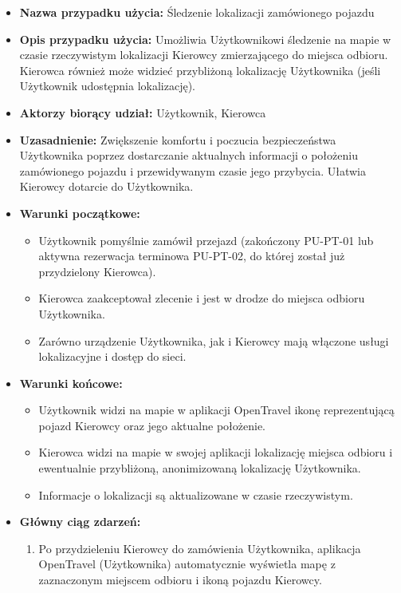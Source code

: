 \documentclass[a4paper,12pt]{article}
\begin{document}
\begin{itemize}
    \item \textbf{Nazwa przypadku użycia:} Śledzenie lokalizacji zamówionego pojazdu
    \item \textbf{Opis przypadku użycia:} Umożliwia Użytkownikowi śledzenie na mapie w czasie rzeczywistym lokalizacji Kierowcy zmierzającego do miejsca odbioru. Kierowca również może widzieć przybliżoną lokalizację Użytkownika (jeśli Użytkownik udostępnia lokalizację).
    \item \textbf{Aktorzy biorący udział:} Użytkownik, Kierowca
    \item \textbf{Uzasadnienie:} Zwiększenie komfortu i poczucia bezpieczeństwa Użytkownika poprzez dostarczanie aktualnych informacji o położeniu zamówionego pojazdu i przewidywanym czasie jego przybycia. Ułatwia Kierowcy dotarcie do Użytkownika.
    \item \textbf{Warunki początkowe:}
        \begin{itemize}
            \item Użytkownik pomyślnie zamówił przejazd (zakończony PU-PT-01 lub aktywna rezerwacja terminowa PU-PT-02, do której został już przydzielony Kierowca).
            \item Kierowca zaakceptował zlecenie i jest w drodze do miejsca odbioru Użytkownika.
            \item Zarówno urządzenie Użytkownika, jak i Kierowcy mają włączone usługi lokalizacyjne i dostęp do sieci.
        \end{itemize}
    \item \textbf{Warunki końcowe:}
        \begin{itemize}
            \item Użytkownik widzi na mapie w aplikacji OpenTravel ikonę reprezentującą pojazd Kierowcy oraz jego aktualne położenie.
            \item Kierowca widzi na mapie w swojej aplikacji lokalizację miejsca odbioru i ewentualnie przybliżoną, anonimizowaną lokalizację Użytkownika.
            \item Informacje o lokalizacji są aktualizowane w czasie rzeczywistym.
        \end{itemize}
    \item \textbf{Główny ciąg zdarzeń:}
        \begin{enumerate}
            \item Po przydzieleniu Kierowcy do zamówienia Użytkownika, aplikacja OpenTravel (Użytkownika) automatycznie wyświetla mapę z zaznaczonym miejscem odbioru i ikoną pojazdu Kierowcy.

\end{enumerate}
\end{itemize}
\end{document}
